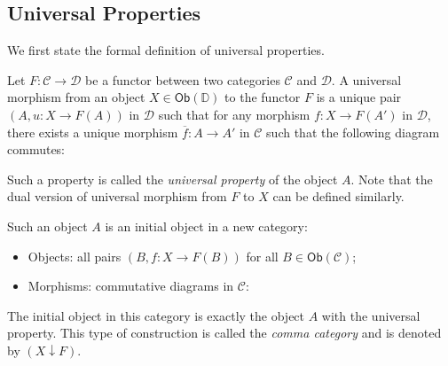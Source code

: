 \documentclass[
	11pt, %
	fleqn, %
	a4paper, %
]{LegrandOrangeBook}
\renewcommand{\bar}[1]{\overline{#1}} %
\newcommand{\C}{\mathcal{C}} %
\newcommand{\D}{\mathcal{D}} %
\newcommand{\Ob}[1]{\mathsf{Ob}(#1)} %
\begin{document}
\begin{appendices}

\renewcommand{\chaptername}{Appendix} %


\chapter{Universal Properties}

We first state the formal definition of universal properties.

\begin{definition}
    Let $F : \C \to \D$ be a functor between two categories $\C$ and $\D$. A universal morphism from an object $X \in \Ob{\mathbb{D}}$ to the functor $F$ is a unique pair $(A, u : X \to F(A))$ in $\D$ such that for any morphism $f : X \to F(A')$ in $\D$, there exists a unique morphism $\bar{f} : A \to A'$ in $\C$ such that the following diagram commutes:
    \begin{center}
    \end{center}
    Such a property is called the \emph{universal property} of the object $A$. Note that the dual version of universal morphism from $F$ to $X$ can be defined similarly.
\end{definition}

\begin{remark}
    Such an object $A$ is an initial object in a new category:
    \begin{itemize}
        \item Objects: all pairs $(B, f : X \to F(B))$ for all $B \in \Ob{\C}$;
        \item Morphisms: commutative diagrams in $\C$:
    \end{itemize}
    \begin{center}
    \end{center}
    The initial object in this category is exactly the object $A$ with the universal property. This type of construction is called the \emph{comma category} and is denoted by $(X \downarrow F)$.


\end{remark}
\end{appendices}
\end{document}
